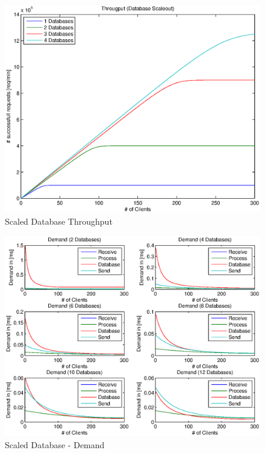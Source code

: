 \documentclass[a4paper]{article}
\begin{document}
\begin{figure}[H]
	\begin{center}
    \includegraphics[scale=0.6]{../plots-ms2-mg/dbscaleout-tp.eps}
  \end{center}
  \caption{Scaled Database Throughput}
  \label{fig:dbscaleout-tp}
\end{figure}




\begin{figure}[H]
	\begin{center}
    \includegraphics[scale=0.8]{../plots-ms2-mg/dbscaleout-demand-0.eps}
  \end{center}
  \caption{Scaled Database - Demand}
  \label{fig:dbscaleout-demand}
\end{figure}
\end{document}
